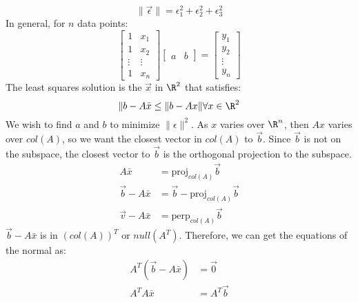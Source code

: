 \documentclass{math}
\begin{document}
\[ \|\vec{\epsilon}\| = \epsilon_1^2+\epsilon_2^2+\epsilon_3^2 \]
In general, for \( n \) data points:
\[ \begin{bmatrix}
  1 & x_1 \\
  1 & x_2 \\
  \vdots & \vdots \\
  1 & x_n
\end{bmatrix}\begin{bmatrix}a & b\end{bmatrix} = \begin{bmatrix}
  y_1 \\ y_2 \\ \vdots \\ y_n
\end{bmatrix} \]
The least squares solution is the \( \vec{x} \) in \( \R^2 \) that satisfies:
\[ \|b-A\bar{x} \le \|b-Ax\|\forall x\in\R^2 \]
We wish to find \( a \) and \( b \) to minimize \( \|\epsilon\|^2 \). As \( x \)
varies over \( \R^n \), then \( Ax \) varies over \( col(A) \), so we want the
closest vector in \( col(A) \) to \( \vec{b} \). Since \( \vec{b} \) is not on
the subspace, the closest vector to \( \vec{b} \) is the orthogonal projection
to the subspace.
\begin{align*}
  A\bar{x} &= \text{proj}_{col(A)}\vec{b} \\
  \vec{b}-A\bar{x} &= \vec{b}-\text{proj}_{col(A)}\vec{b} \\
  \vec{v}-A\bar{x} &= \text{perp}_{col(A)}\vec{b}
\end{align*}
\( \vec{b}-A\bar{x} \) is in \( (col(A))^T \) or \( null(A^T) \). Therefore,
we can get the equations of the normal as:
\begin{align*}
  A^T(\vec{b}-A\bar{x}) &= \vec{0} \\
  A^TA\bar{x} &= A^T\vec{b}
\end{align*}
\end{document}
